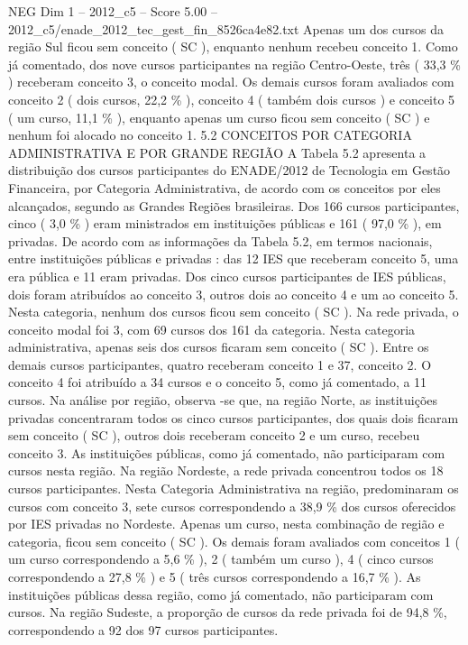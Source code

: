 \begin{textsample}{NEG Dim 1 – 2012\_c5 – Score 5.00 – 2012\_c5/enade\_2012\_tec\_gest\_fin\_8526ca4e82.txt}
Apenas um dos cursos da região Sul ficou sem conceito ( SC ), enquanto nenhum recebeu conceito 1.
Como já comentado, dos nove cursos participantes na região Centro-Oeste, três ( 33,3 \% ) receberam conceito 3, o conceito modal.
Os demais cursos foram avaliados com conceito 2 ( dois cursos, 22,2 \% ), conceito 4 ( também dois cursos ) e conceito 5 ( um curso, 11,1 \% ), enquanto apenas um curso ficou sem conceito ( SC ) e nenhum foi alocado no conceito 1. 5.2 CONCEITOS POR CATEGORIA ADMINISTRATIVA E POR GRANDE REGIÃO A Tabela 5.2 apresenta a distribuição dos cursos participantes do ENADE/2012 de Tecnologia em Gestão Financeira, por Categoria Administrativa, de acordo com os conceitos por eles alcançados, segundo as Grandes Regiões brasileiras.
Dos 166 cursos participantes, cinco ( 3,0 \% ) eram ministrados em instituições públicas e 161 ( 97,0 \% ), em privadas.
De acordo com as informações da Tabela 5.2, em termos nacionais, entre instituições públicas e privadas : das 12 IES que receberam conceito 5, uma era pública e 11 eram privadas.
Dos cinco cursos participantes de IES públicas, dois foram atribuídos ao conceito 3, outros dois ao conceito 4 e um ao conceito 5.
Nesta categoria, nenhum dos cursos ficou sem conceito ( SC ).
Na rede privada, o conceito modal foi 3, com 69 cursos dos 161 da categoria.
Nesta categoria administrativa, apenas seis dos cursos ficaram sem conceito ( SC ).
Entre os demais cursos participantes, quatro receberam conceito 1 e 37, conceito 2.
O conceito 4 foi atribuído a 34 cursos e o conceito 5, como já comentado, a 11 cursos.
Na análise por região, observa -se que, na região Norte, as instituições privadas concentraram todos os cinco cursos participantes, dos quais dois ficaram sem conceito ( SC ), outros dois receberam conceito 2 e um curso, recebeu conceito 3.
As instituições públicas, como já comentado, não participaram com cursos nesta região.
Na região Nordeste, a rede privada concentrou todos os 18 cursos participantes.
Nesta Categoria Administrativa na região, predominaram os cursos com conceito 3, sete cursos correspondendo a 38,9 \% dos cursos oferecidos por IES privadas no Nordeste.
Apenas um curso, nesta combinação de região e categoria, ficou sem conceito ( SC ).
Os demais foram avaliados com conceitos 1 ( um curso correspondendo a 5,6 \% ), 2 ( também um curso ), 4 ( cinco cursos correspondendo a 27,8 \% ) e 5 ( três cursos correspondendo a 16,7 \% ).
As instituições públicas dessa região, como já comentado, não participaram com cursos.
Na região Sudeste, a proporção de cursos da rede privada foi de 94,8 \%, correspondendo a 92 dos 97 cursos participantes.

\end{textsample}
